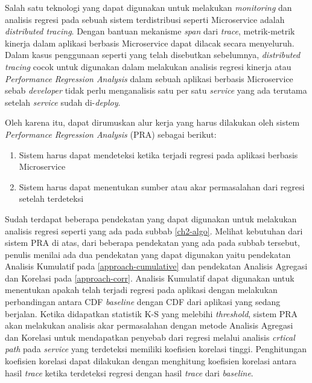 Salah satu teknologi yang dapat digunakan untuk melakukan \textit{monitoring} dan analisis regresi pada sebuah sistem terdistribusi seperti Microservice adalah \textit{distributed tracing}. Dengan bantuan mekanisme \textit{span} dari \textit{trace}, metrik-metrik kinerja dalam aplikasi berbasis Microservice dapat dilacak secara menyeluruh. Dalam kasus penggunaan seperti yang telah disebutkan sebelumnya, \textit{distributed tracing} cocok untuk digunakan dalam melakukan analisis regresi kinerja atau \textit{Performance Regression Analysis} dalam sebuah aplikasi berbasis Microservice sebab \textit{developer} tidak perlu menganalisis satu per satu \textit{service} yang ada terutama setelah \textit{service} sudah di-\textit{deploy}.

Oleh karena itu, dapat dirumuskan alur kerja yang harus dilakukan oleh sistem \textit{Performance Regression Analysis} (PRA) sebagai berikut:
\begin{enumerate}
	\item Sistem harus dapat mendeteksi ketika terjadi regresi pada aplikasi berbasis Microservice
	\item Sistem harus dapat menentukan sumber atau akar permasalahan dari regresi setelah terdeteksi
\end{enumerate}

Sudah terdapat beberapa pendekatan yang dapat digunakan untuk melakukan analisis regresi seperti yang ada pada subbab \ref{ch2-algo}. Melihat kebutuhan dari sistem PRA di atas, dari beberapa pendekatan yang ada pada subbab tersebut, penulis menilai ada dua pendekatan yang dapat digunakan yaitu pendekatan Analisis Kumulatif pada \ref{approach-cumulative} dan pendekatan Analisis Agregasi dan Korelasi pada \ref{approach-corr}. Analisis Kumulatif dapat digunakan untuk menentukan apakah telah terjadi regresi pada aplikasi dengan melakukan perbandingan antara CDF \textit{baseline} dengan CDF dari aplikasi yang sedang berjalan. Ketika didapatkan statistik K-S yang melebihi \textit{threshold}, sistem PRA akan melakukan analisis akar permasalahan dengan metode Analisis Agregasi dan Korelasi untuk mendapatkan penyebab dari regresi melalui analisis \textit{crtical path} pada \textit{service} yang terdeteksi memiliki koefisien korelasi tinggi. Penghitungan koefisien korelasi dapat dilakukan dengan menghitung koefisien korelasi antara hasil \textit{trace} ketika terdeteksi regresi dengan hasil \textit{trace} dari \textit{baseline}.

